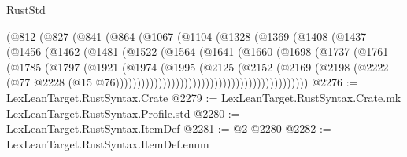 \begin{lexlean}{RustStd}
\begin{coremodule}
                              (@812
                                (@827
                                  (@841
                                    (@864
                                      (@1067
                                        (@1104
                                          (@1328
                                            (@1369
                                              (@1408
                                                (@1437
                                                  (@1456
                                                    (@1462
                                                      (@1481
                                                        (@1522
                                                          (@1564
                                                            (@1641
                                                              (@1660
                                                                (@1698
                                                                  (@1737
                                                                    (@1761
                                                                      (@1785
                                                                        (@1797
                                                                          (@1921
                                                                            (@1974
                                                                              (@1995
                                                                                (@2125
                                                                                  (@2152
                                                                                    (@2169
                                                                                      (@2198
                                                                                        (@2222
                                                                                          (@77
                                                                                            @2228
                                                                                            (@15
                                                                                              @76)))))))))))))))))))))))))))))))))))))))))))))
@2276 := LexLeanTarget.RustSyntax.Crate
@2279 := LexLeanTarget.RustSyntax.Crate.mk LexLeanTarget.RustSyntax.Profile.std
@2280 := LexLeanTarget.RustSyntax.ItemDef
@2281 := @2 @2280
@2282 := LexLeanTarget.RustSyntax.ItemDef.enum

\end{coremodule}
\end{lexlean}
